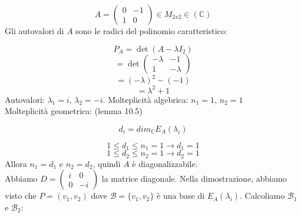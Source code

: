 \documentclass[12pt]{article}
\begin{document}
\[A = \begin{pmatrix}
    0 & -1\\
    1 & 0
\end{pmatrix} \in M_{2x2} \in (\mathbb{C})\]
Gli autovalori di $A$ sono le radici del polinomio caratteristico:

\[P_A = \det{(A - \lambda I_2)}\]
\[= \det{\begin{pmatrix}
    -\lambda & -1\\
    1 & -\lambda
\end{pmatrix}}\]
\[= (-\lambda)^2 - (-1) \]
\[= \lambda^2 + 1\]
Autovalori: $\lambda_1 = i$, $\lambda_2 = -i$.
Molteplicità algebrica: $n_1 = 1$, $n_2 = 1$\\
Molteplicità geometrica: (lemma 10.5)

\[d_i = dim_{\mathbb{C}}E_A(\lambda_i)\]

\[1 \le d_1 \le n_1 = 1 \rightarrow d_1 = 1\]
\[1 \le d_2 \le n_2 = 1 \rightarrow d_2 = 1\]
Allora $n_1 = d_1$ e $n_2 = d_2$, quindi $A$ è diagonalizzabile. \\
Abbiamo $D = \begin{pmatrix}
    i & 0\\
    0 & -i
\end{pmatrix}$ la matrice diagonale.
Nella dimostrazione, abbiamo visto che $P = (v_1, v_2)$ dove $\mathcal{B} = \{v_1, v_2\}$ è una base di $E_A(\lambda_i)$. Calcoliamo $\mathcal{B}_1$ e $\mathcal{B}_2$:
\end{document}
